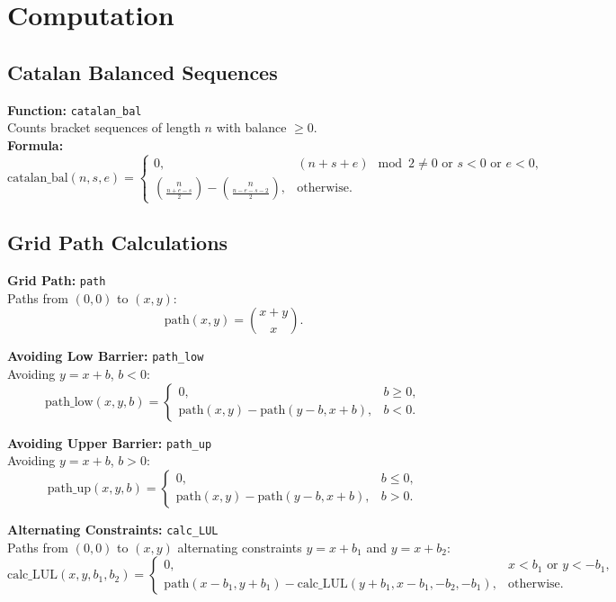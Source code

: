 \section{Computation}
    \subsection{Catalan Balanced Sequences}
    \textbf{Function:} \texttt{catalan\_bal} \\
    Counts bracket sequences of length $n$ with balance $\geq 0$. \\
    \textbf{Formula:}
    \[
    \text{catalan\_bal}(n, s, e) =
    \begin{cases}
    0, & (n+s+e)\!\mod\!2 \neq 0 \text{ or } s<0 \text{ or } e<0, \\
    \binom{n}{\frac{n+e-s}{2}} - \binom{n}{\frac{n-e-s-2}{2}}, & \text{otherwise}.
    \end{cases}
    \]

    \subsection{Grid Path Calculations}
    \textbf{Grid Path:} \texttt{path} \\
    Paths from $(0, 0)$ to $(x, y)$:
    \[
    \text{path}(x, y) = \binom{x+y}{x}.
    \]

    \textbf{Avoiding Low Barrier:} \texttt{path\_low} \\
    Avoiding $y=x+b$, $b<0$:
    \[
    \text{path\_low}(x, y, b) = 
    \begin{cases}
    0, & b\geq 0, \\
    \text{path}(x, y) - \text{path}(y-b, x+b), & b<0.
    \end{cases}
    \]

    \textbf{Avoiding Upper Barrier:} \texttt{path\_up} \\
    Avoiding $y=x+b$, $b>0$:
    \[
    \text{path\_up}(x, y, b) = 
    \begin{cases}
    0, & b\leq 0, \\
    \text{path}(x, y) - \text{path}(y-b, x+b), & b>0.
    \end{cases}
    \]

    \textbf{Alternating Constraints:} \texttt{calc\_LUL} \\
    Paths from $(0, 0)$ to $(x, y)$ alternating constraints $y=x+b_1$ and $y=x+b_2$:
    \[
    \text{calc\_LUL}(x, y, b_1, b_2) = 
    \begin{cases}
    0, & x<b_1 \text{ or } y<-b_1, \\
    \text{path}(x-b_1, y+b_1) - \text{calc\_LUL}(y+b_1, x-b_1, -b_2, -b_1), & \text{otherwise}.
    \end{cases}
    \]

